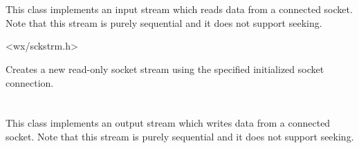 
\section{}\label{wxsocketinputstream}

This class implements an input stream which reads data from
a connected socket. Note that this stream is purely sequential
and it does not support seeking.




<wx/sckstrm.h>




\label{wxsocketinputstreamctor}


Creates a new read-only socket stream using the specified initialized
socket connection. 

\section{}\label{wxsocketoutputstream}

This class implements an output stream which writes data from
a connected socket. Note that this stream is purely sequential
and it does not support seeking.


